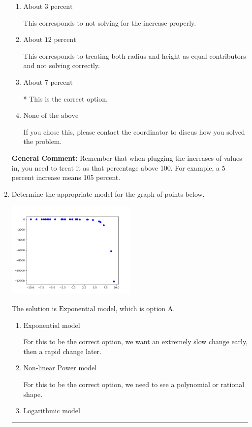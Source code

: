 \documentclass{extbook}[14pt]
\newcommand{\litem}[1]{\item #1

\rule{\textwidth}{0.4pt}}
\begin{document}
\begin{enumerate}
{\begin{enumerate}[label=\Alph*.]
This corresponds to solving correctly but treating both radius and height as equal contributors to the volume.
\item \( \text{About } 3 \text{ percent} \)

This corresponds to not solving for the increase properly.
\item \( \text{About } 12 \text{ percent} \)

This corresponds to treating both radius and height as equal contributors and not solving correctly.
\item \( \text{About } 7 \text{ percent} \)

* This is the correct option.
\item \( \text{None of the above} \)

If you chose this, please contact the coordinator to discus how you solved the problem.
\end{enumerate}

\textbf{General Comment:} Remember that when plugging the increases of values in, you need to treat it as that percentage above 100. For example, a 5 percent increase means 105 percent.
}
\litem{
Determine the appropriate model for the graph of points below.

\begin{center}
    \includegraphics[width=0.5\textwidth]{../Figures/identifyModelGraph12CopyB.png}
\end{center}


The solution is \( \text{Exponential model} \), which is option A.\begin{enumerate}[label=\Alph*.]
\item \( \text{Exponential model} \)

For this to be the correct option, we want an extremely slow change early, then a rapid change later.
\item \( \text{Non-linear Power model} \)

For this to be the correct option, we need to see a polynomial or rational shape.
\item \( \text{Logarithmic model} \)


\end{enumerate}}
\end{enumerate}
\end{document}
